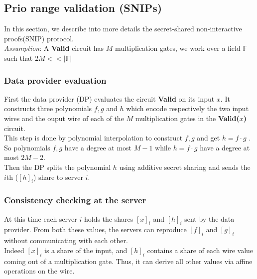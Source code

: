 \documentclass{article}
\begin{document}
\subsection{Prio range validation (SNIPs)}
In this section, we describe into more details the secret-shared non-interactive proofs(SNIP) protocol.\\
\textit{Assumption}: A \textbf{Valid} circuit has $M$ multiplication gates, we work over a field $\mathbb{F}$ such that $ 2M << |\mathbb{F}| $\\
\subsubsection{Data provider evaluation}
First the data provider (DP) evaluates the circuit \textbf{Valid} on its input $x$. It constructs three polynomials $f,g $ and $h$  which encode respectively the two input wires and the ouput wire of each of the $M$ multiplication gates in the \textbf{Valid($x$)} circuit.\\
This step is done by polynomial interpolation to construct $f,g$ and get $h = f \cdot g$ .\\
So polynomials $f,g$ have a degree at most $M-1$ while $h = f \cdot g$ have a degree at most $2M-2$.\\
Then the DP splits the polynomial $h$ using additive secret sharing and sends the $i$th ($[h]_i$) share to server $i$.
\subsubsection{Consistency checking at the server}
At this time each server $i$ holds the shares $[x]_i$ and $[h]_i$ sent by the data provider. From both these values, the servers can reproduce $[f]_i$ and $[g]_i$ without communicating with each other.\\
Indeed $[x]_i$ is a share of the input, and $[h]_i$ contains a share of each wire value coming out of a multiplication gate. Thus, it can derive all other values via affine operations on the wire.
\end{document}
